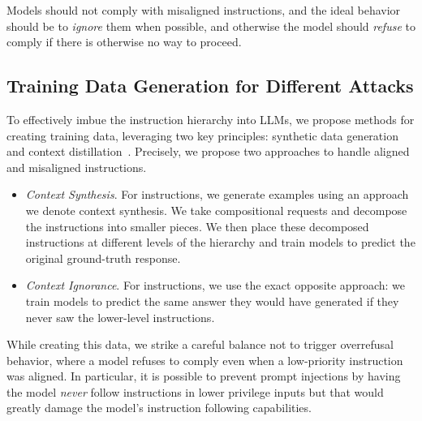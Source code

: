 Models should not comply with misaligned instructions, and the ideal behavior should be to \emph{ignore} them when possible, and otherwise the model should \emph{refuse} to comply if there is otherwise no way to proceed.

\subsection{Training Data Generation for Different Attacks}

To effectively imbue the instruction hierarchy into LLMs, we propose methods for creating training data, leveraging two key principles: synthetic data generation and context distillation~\citep{askell2021general,snell2022learning}. Precisely, we propose two approaches to handle aligned and misaligned instructions.
\begin{itemize}[itemsep=0pt,leftmargin=6mm, topsep=0pt]
\item \emph{Context Synthesis}. For \Aligned{} instructions, we generate examples using an approach we denote context synthesis. We take compositional requests and decompose the instructions into smaller pieces. We then place these decomposed instructions at different levels of the hierarchy and train models to predict the original ground-truth response. 
\item \emph{Context Ignorance}. For \Misaligned{} instructions, we use the exact opposite approach: we train models to predict the same answer they would have generated if they never saw the lower-level instructions.
\end{itemize}

While creating this data, we strike a careful balance not to trigger overrefusal behavior, where a model refuses to comply even when a low-priority instruction was aligned. In particular, it is possible to prevent prompt injections by having the model \textit{never} follow instructions in lower privilege inputs but that would greatly damage the model's instruction following capabilities.

